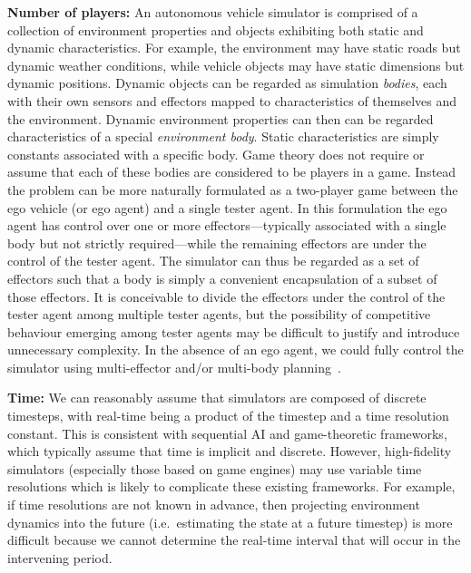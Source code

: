\documentclass[10pt]{article}
\theoremstyle{plain}
\newenvironment{note}[1][]{\par\smallskip\noindent\textbf{#1}\rmfamily}{\smallskip}
\begin{document}
\begin{note}[Number of players:]
    An autonomous vehicle simulator is comprised of a collection of environment properties and objects exhibiting both static and dynamic characteristics.
    For example, the environment may have static roads but dynamic weather conditions, while vehicle objects may have static dimensions but dynamic positions.
    Dynamic objects can be regarded as simulation \emph{bodies}, each with their own sensors and effectors mapped to characteristics of themselves and the environment.
    Dynamic environment properties can then can be regarded characteristics of a special \emph{environment body}.
    Static characteristics are simply constants associated with a specific body.
    Game theory does not require or assume that each of these bodies are considered to be players in a game.
    Instead the problem can be more naturally formulated as a two-player game between the ego vehicle (or ego agent) and a single tester agent.
    In this formulation the ego agent has control over one or more effectors---typically associated with a single body but not strictly required---while the remaining effectors are under the control of the tester agent.
    The simulator can thus be regarded as a set of effectors such that a body is simply a convenient encapsulation of a subset of those effectors.
    It is conceivable to divide the effectors under the control of the tester agent among multiple tester agents, but the possibility of competitive behaviour emerging among tester agents may be difficult to justify and introduce unnecessary complexity.
    In the absence of an ego agent, we could fully control the simulator using multi-effector and/or multi-body planning~\cite{Russell:book:2009}.
\end{note}

\begin{note}[Time:]
    We can reasonably assume that simulators are composed of discrete timesteps, with real-time being a product of the timestep and a time resolution constant.
    This is consistent with sequential AI and game-theoretic frameworks, which typically assume that time is implicit and discrete.
    However, high-fidelity simulators (especially those based on game engines) may use variable time resolutions which is likely to complicate these existing frameworks.
    For example, if time resolutions are not known in advance, then projecting environment dynamics into the future (i.e.\ estimating the state at a future timestep) is more difficult because we cannot determine the real-time interval that will occur in the intervening period.
\end{note}
\end{document}
